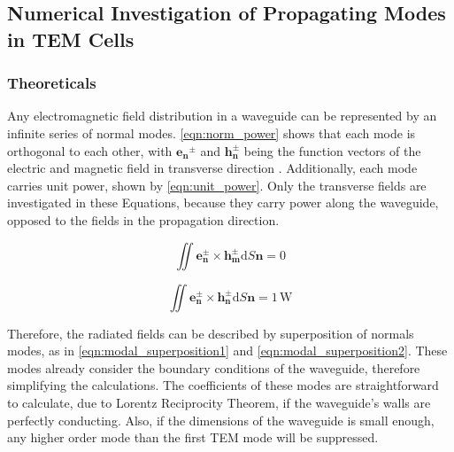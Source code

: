 \subsection{Numerical Investigation of Propagating Modes in TEM Cells}
\subsubsection{Theoreticals}



Any electromagnetic field distribution in a waveguide can be represented by an infinite series of normal modes. \autoref{eqn:norm_power} shows that each mode is orthogonal to each other, with $\mathbf{e_n}^\pm$ and $\mathbf{h_n^\pm}$ being the function vectors of the electric and magnetic field in transverse direction \cite{Collin_2015}. Additionally, each mode carries unit power, shown by \autoref{eqn:unit_power}. Only the transverse fields are investigated in these Equations, because they carry power along the waveguide, opposed to the fields in the propagation direction.

\begin{equation}
    \iint \mathbf{e_n^\pm}\times \mathbf{h_m^\pm}\mathrm{d}S\mathbf{n}=0
    \label{eqn:norm_power}
\end{equation}

\begin{equation}
    \iint \mathbf{e_n^\pm}\times \mathbf{h_n^\pm}\mathrm{d}S\mathbf{n}=1\,\mathrm{W}
    \label{eqn:unit_power}
\end{equation}

Therefore, the radiated fields can be described by superposition of normals modes, as in \autoref{eqn:modal_superposition1} and \autoref{eqn:modal_superposition2}. These modes already consider the boundary conditions of the waveguide, therefore simplifying the calculations. The coefficients of these modes are straightforward to calculate, due to Lorentz Reciprocity Theorem, if the waveguide's walls are perfectly conducting. Also, if the dimensions of the waveguide is small enough, any higher order mode than the first TEM mode will be suppressed. 

